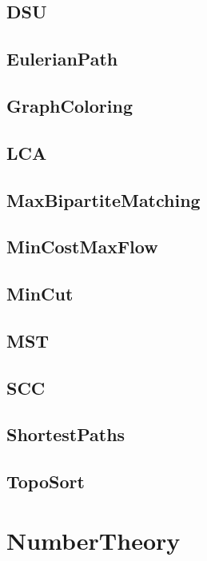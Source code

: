 \documentclass[a4paper, twocolumn]{article}
\begin{document}
\subsection{DSU}

\subsection{EulerianPath}

\subsection{GraphColoring}

\subsection{LCA}

\subsection{MaxBipartiteMatching}

\subsection{MinCostMaxFlow}

\subsection{MinCut}

\subsection{MST}

\subsection{SCC}

\subsection{ShortestPaths}

\subsection{TopoSort}

\section{NumberTheory}
\end{document}
